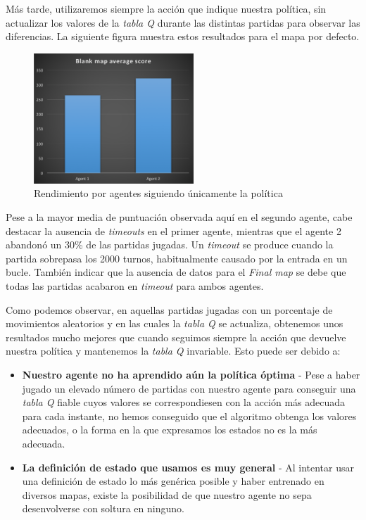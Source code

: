 \documentclass[12pt]{article}
\begin{document}
Más tarde, utilizaremos siempre la acción que indique nuestra política, sin actualizar los valores de la \textit{tabla Q} durante las distintas partidas para observar las diferencias. La siguiente figura muestra estos resultados para el mapa por defecto.

\begin{figure}[h]
    \centering
    \includegraphics[width=6cm]{bmap_b}
    \caption{Rendimiento por agentes siguiendo únicamente la política}
\end{figure}

\newpage
Pese a la mayor media de puntuación observada aquí en el segundo agente, cabe destacar la ausencia de \textit{timeouts} en el primer agente, mientras que el agente 2 abandonó un 30\% de las partidas jugadas. Un \textit{timeout} se produce cuando la partida sobrepasa los 2000 turnos, habitualmente causado por la entrada en un bucle.
También indicar que la ausencia de datos para el \textit{Final map} se debe que todas las partidas acabaron en \textit{timeout} para ambos agentes.

\vspace{0.5cm}

Como podemos observar, en aquellas partidas jugadas con un porcentaje de movimientos aleatorios y en las cuales la \textit{tabla Q} se actualiza, obtenemos unos resultados mucho mejores que cuando seguimos siempre la acción que devuelve nuestra política y mantenemos la \textit{tabla Q} invariable. Esto puede ser debido a:

\begin{itemize}
	\item \textbf{Nuestro agente no ha aprendido aún la política óptima} - Pese a haber jugado un elevado número de partidas con nuestro agente para conseguir una \textit{tabla Q} fiable cuyos valores se correspondiesen con la acción más adecuada para cada instante, no hemos conseguido que el algoritmo obtenga los valores adecuados, o la forma en la que expresamos los estados no es la más adecuada.
	\item \textbf{La definición de estado que usamos es muy general} - Al intentar usar una definición de estado lo más genérica posible y haber entrenado en diversos mapas, existe la posibilidad de que nuestro agente no sepa desenvolverse con soltura en ninguno.
\end{itemize}
\end{document}
